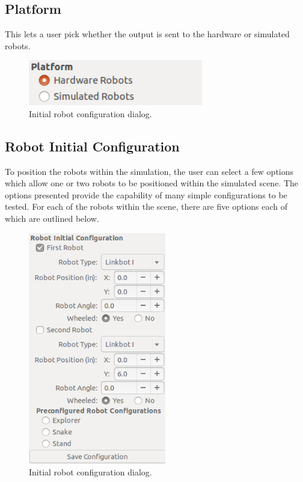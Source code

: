 \documentclass{article}
\begin{document}
\subsection{Platform}
This lets a user pick whether the output is sent to the hardware or simulated
robots.
\begin{figure}[H]
	\begin{center}
		\includegraphics[width=3in]{images/platform}
	\end{center}
	\caption{Initial robot configuration dialog.}
	\label{fig:platform}
\end{figure}

\subsection{Robot Initial Configuration}
To position the robots within the simulation, the user can select a few options
which allow one or two robots to be positioned within the simulated scene.  The
options presented provide the capability of many simple configurations to be
tested.  For each of the robots within the scene, there are five options each of
which are outlined below.
\begin{figure}[H]
	\begin{center}
		\includegraphics[height=4in]{images/configuration}
	\end{center}
	\caption{Initial robot configuration dialog.}
	\label{fig:config}
\end{figure}
\end{document}
